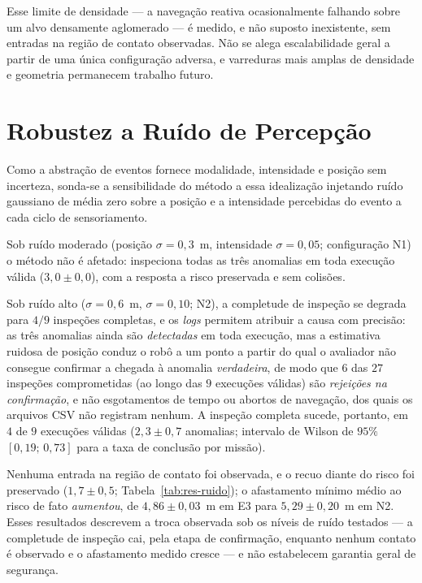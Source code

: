Esse limite de densidade --- a navegação reativa ocasionalmente falhando sobre um
alvo densamente aglomerado --- é medido, e não suposto inexistente, sem entradas na
região de contato observadas. Não se alega escalabilidade geral a partir de uma única
configuração adversa, e varreduras mais amplas de densidade e geometria permanecem
trabalho futuro.

\section{Robustez a Ruído de Percepção}
\label{sec:res-ruido}

Como a abstração de eventos fornece modalidade, intensidade e posição sem incerteza,
sonda-se a sensibilidade do método a essa idealização injetando ruído gaussiano de
média zero sobre a posição e a intensidade percebidas do evento a cada ciclo de
sensoriamento.

Sob ruído moderado (posição $\sigma=0{,}3$~m, intensidade $\sigma=0{,}05$;
configuração N1) o método não é afetado: inspeciona todas as três anomalias em toda
execução válida ($3{,}0\pm0{,}0$), com a resposta a risco preservada e sem colisões.

Sob ruído alto ($\sigma=0{,}6$~m, $\sigma=0{,}10$; N2), a completude de inspeção se
degrada para $4/9$ inspeções completas, e os \textit{logs} permitem atribuir a causa
com precisão: as três anomalias ainda são \emph{detectadas} em toda execução, mas a
estimativa ruidosa de posição conduz o robô a um ponto a partir do qual o avaliador
não consegue confirmar a chegada à anomalia \emph{verdadeira}, de modo que $6$ das
$27$ inspeções comprometidas (ao longo das $9$ execuções válidas) são
\emph{rejeições na confirmação}, e não esgotamentos de tempo ou abortos de
navegação, dos quais os arquivos CSV não registram nenhum. A inspeção completa
sucede, portanto, em $4$ de $9$ execuções válidas ($2{,}3\pm0{,}7$ anomalias;
intervalo de Wilson de $95\%$ $[0{,}19;\,0{,}73]$ para a taxa de conclusão por
missão).

Nenhuma entrada na região de contato foi observada, e o recuo diante do risco foi
preservado ($1{,}7\pm0{,}5$; Tabela~\ref{tab:res-ruido}); o afastamento mínimo médio
ao risco de fato \emph{aumentou}, de $4{,}86\pm0{,}03$~m em E3 para
$5{,}29\pm0{,}20$~m em N2. Esses resultados descrevem a troca observada sob os níveis
de ruído testados --- a completude de inspeção cai, pela etapa de confirmação,
enquanto nenhum contato é observado e o afastamento medido cresce --- e não
estabelecem garantia geral de segurança.

